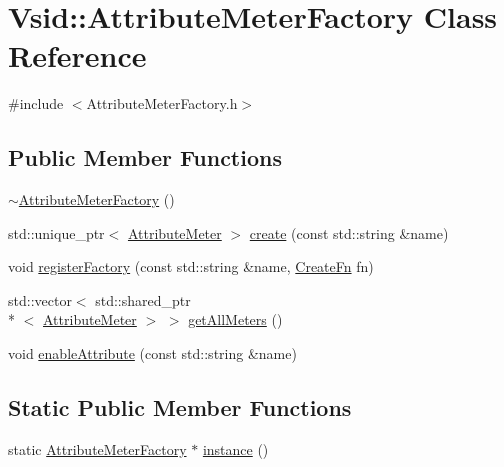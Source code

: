 \hypertarget{class_vsid_1_1_attribute_meter_factory}{\section{Vsid\-:\-:Attribute\-Meter\-Factory Class Reference}
\label{class_vsid_1_1_attribute_meter_factory}
}


{\ttfamily \#include $<$Attribute\-Meter\-Factory.\-h$>$}

\subsection*{Public Member Functions}
\begin{DoxyCompactItemize}
\item 
\hyperlink{class_vsid_1_1_attribute_meter_factory_aa2cd9ab8b4326a737202c8657b04edb1}{$\sim$\-Attribute\-Meter\-Factory} ()
\item 
std\-::unique\-\_\-ptr$<$ \hyperlink{class_vsid_1_1_attribute_meter}{Attribute\-Meter} $>$ \hyperlink{class_vsid_1_1_attribute_meter_factory_ab376f8420a3c689e5691bbae5b8867a8}{create} (const std\-::string \&name)
\item 
void \hyperlink{class_vsid_1_1_attribute_meter_factory_af6f53e148905ddbc86b73b4050f4df2e}{register\-Factory} (const std\-::string \&name, \hyperlink{namespace_vsid_a2e5380ba00fdc73183f700ae57702bc3}{Create\-Fn} fn)
\item 
std\-::vector$<$ std\-::shared\-\_\-ptr\\*
$<$ \hyperlink{class_vsid_1_1_attribute_meter}{Attribute\-Meter} $>$ $>$ \hyperlink{class_vsid_1_1_attribute_meter_factory_ae44a5e19247998216c9e55112c790dea}{get\-All\-Meters} ()
\item 
void \hyperlink{class_vsid_1_1_attribute_meter_factory_a879a30730590e0f5cfd597f5ae30084a}{enable\-Attribute} (const std\-::string \&name)
\end{DoxyCompactItemize}
\subsection*{Static Public Member Functions}
\begin{DoxyCompactItemize}
\item 
static \hyperlink{class_vsid_1_1_attribute_meter_factory}{Attribute\-Meter\-Factory} $\ast$ \hyperlink{class_vsid_1_1_attribute_meter_factory_a6cdacc430c359906c85ef36a7c6842fc}{instance} ()
\end{DoxyCompactItemize}


